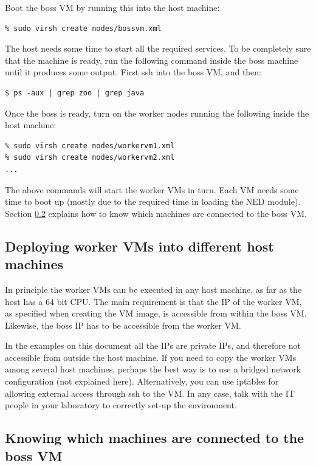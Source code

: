 \documentclass[a4]{article}
\begin{document}
Boot the boss VM by running this into the host machine:
	
\begin{verbatim}
% sudo virsh create nodes/bossvm.xml
\end{verbatim}
	
The host needs some time to start all the required services. To be
completely sure that the machine is ready, run the following command inside
the boss machine until it produces some output. First ssh into the boss VM,
and then:

\begin{verbatim}
$ ps -aux | grep zoo | grep java
\end{verbatim}

Once the boss is ready, turn on the worker nodes running the following
inside the host machine:

\begin{verbatim}
% sudo virsh create nodes/workervm1.xml
% sudo virsh create nodes/workervm2.xml
...
\end{verbatim}

The above commands will start the worker VMs in turn. Each VM needs some
time to boot up (mostly due to the required time in loading the NED
module). Section \ref{sec:know-which-mach} explains how to know which
machines are connected to the boss VM.

\subsection{Deploying worker VMs into different host machines}
\label{sec:deploting-worker-vms}

In principle the worker VMs can be executed in any host machine, as far as
the host has a 64 bit CPU. The main requirement is that the IP of the worker
VM, as specified when creating the VM image, is accessible from within the
boss VM. Likewise, the boss IP has to be accessible from the worker VM.

In the examples on this document all the IPs are private IPs, and therefore
not accessible from outside the host machine. If you need to copy the worker
VMs among several host machines, perhaps the best way is to use a bridged
network configuration (not explained here). Alternatively, you can use
iptables for allowing external access through ssh to the VM. In any case,
talk with the IT people in your laboratory to correctly set-up the
environment.

\subsection{Knowing which machines are connected to the boss VM}
\label{sec:know-which-mach}
\end{document}
